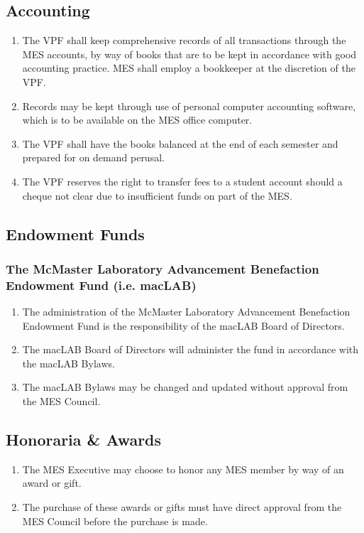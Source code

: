 \subsection{Accounting}
\label{accounting}
\begin{enumerate}
 \item
  The VPF shall keep comprehensive records of all transactions through the MES accounts, by way of books that are to be kept in accordance with good accounting practice. MES shall employ a bookkeeper at the discretion of the VPF.
 \item
  Records may be kept through use of personal computer accounting software, which is to be available on the MES office computer.
 \item
  The VPF shall have the books balanced at the end of each semester and prepared for on demand perusal.
 \item
  The VPF reserves the right to transfer fees to a student account should a cheque not clear due to insufficient funds on part of the MES.

\end{enumerate}

\subsection{Endowment Funds}
\label{endowment-funds}
\subsubsection{The McMaster Laboratory Advancement Benefaction Endowment Fund (i.e. macLAB)}
\label{the-mcmaster-laboratory-advancement-benefaction-endowment-fund-i.e.-maclab}
\begin{enumerate}
 \item
  The administration of the McMaster Laboratory Advancement Benefaction Endowment Fund is the responsibility of the macLAB Board of Directors.
 \item
  The macLAB Board of Directors will administer the fund in accordance with the macLAB Bylaws.
 \item
  The macLAB Bylaws may be changed and updated without approval from the MES Council.

\end{enumerate}

\subsection{Honoraria \& Awards}
\label{honoraria-awards}
\begin{enumerate}
 \item
  The MES Executive may choose to honor any MES member by way of an award or gift.
 \item
  The purchase of these awards or gifts must have direct approval from the MES Council before the purchase is made.

\end{enumerate}

